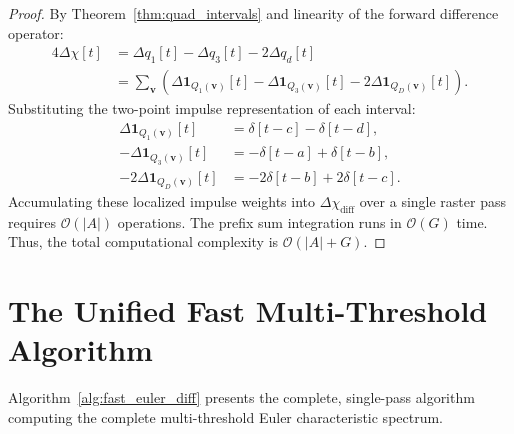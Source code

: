 \documentclass[11pt,a4paper]{article}
\theoremstyle{plain}
\theoremstyle{definition}
\theoremstyle{remark}
\newcommand{\indicator}{\mathbf{1}}
\begin{document}
\begin{proof}
By Theorem~\ref{thm:quad_intervals} and linearity of the forward difference operator:
\begin{align*}
    4 \Delta \chi[t] &= \Delta q_1[t] - \Delta q_3[t] - 2 \Delta q_d[t] \\
    &= \sum_{\mathbf{v}} \left( \Delta \indicator_{Q_1(\mathbf{v})}[t] - \Delta \indicator_{Q_3(\mathbf{v})}[t] - 2 \Delta \indicator_{Q_D(\mathbf{v})}[t] \right).
\end{align*}
Substituting the two-point impulse representation of each interval:
\begin{align*}
    \Delta \indicator_{Q_1(\mathbf{v})}[t] &= \delta[t - c] - \delta[t - d], \\
    -\Delta \indicator_{Q_3(\mathbf{v})}[t] &= -\delta[t - a] + \delta[t - b], \\
    -2\Delta \indicator_{Q_D(\mathbf{v})}[t] &= -2\delta[t - b] + 2\delta[t - c].
\end{align*}
Accumulating these localized impulse weights into $\Delta \chi_{\text{diff}}$ over a single raster pass requires $\mathcal{O}(|A|)$ operations. The prefix sum integration runs in $\mathcal{O}(G)$ time. Thus, the total computational complexity is $\mathcal{O}(|A| + G)$.
\end{proof}

\section{The Unified Fast Multi-Threshold Algorithm}

Algorithm~\ref{alg:fast_euler_diff} presents the complete, single-pass algorithm computing the complete multi-threshold Euler characteristic spectrum.
\end{document}
